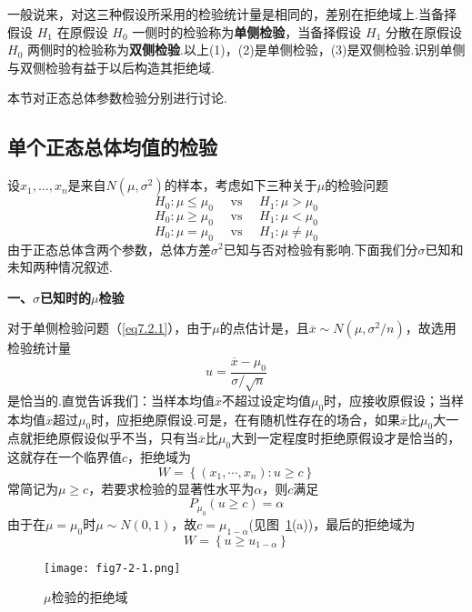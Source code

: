 一般说来，对这三种假设所采用的检验统计量是相同的，差别在拒绝域上.当备择假设 $H_{1}$ 在原假设 $H_{0}$ 一侧时的检验称为\textbf{单侧检验}，当备择假设 $H_{1}$ 分散在原假设 $H_{0}$ 两侧时的检验称为\textbf{双侧检验}.以上(1)，(2)是单侧检验，(3)是双侧检验.识别单侧与双侧检验有益于以后构造其拒绝域.

本节对正态总体参数检验分别进行讨论.
\subsection{单个正态总体均值的检验\label{7.2.1}}
设$x _ { 1 } , \dotsc , x _ { n }$是来自$N(\mu ,\sigma^{2})$的样本，考虑如下三种关于$\mu $的检验问题
\begin{equation}\label{eq7.2.1}
H _ { 0 } : \mu \leq \mu _ { 0 } \quad \text { vs } \quad H _ { 1 } : \mu > \mu _ { 0 }
\end{equation}
\begin{equation}\label{eq7.2.2}
H _ { 0 } : \mu \geq \mu _ { 0 } \quad \text { vs } \quad H _ { 1 } : \mu < \mu _ { 0 }
\end{equation}
\begin{equation}\label{eq7.2.3}
H _ { 0 } : \mu = \mu _ { 0 } \quad \text { vs } \quad H _ { 1 } : \mu \neq \mu _ { 0 }
\end{equation}
由于正态总体含两个参数，总体方差$\sigma^{2}$已知与否对检验有影响.下面我们分$\sigma$已知和未知两种情况叙述.

\textbf{一、$\sigma$已知时的$\mu$检验}

对于单侧检验问题（\ref{eq7.2.1}），由于$\mu $的点估计是，且$\overline { x } \sim N \left( \mu , \sigma ^ { 2 } / n \right)$，故选用检验统计量
\begin{equation}\label{eq7.2.4}
u = \frac { \overline { x } - \mu _ { 0 } } { \sigma / \sqrt { n } }
\end{equation}
是恰当的.直觉告诉我们：当样本均值$\overline{x}$不超过设定均值$\mu_{ 0 }$时，应接收原假设；当样本均值$\overline{x}$超过$\mu_{ 0 }$时，应拒绝原假设.可是，在有随机性存在的场合，如果$\overline{x}$比$\mu_{ 0 }$大一点就拒绝原假设似乎不当，只有当$\overline{x}$比$\mu_{ 0 }$大到一定程度时拒绝原假设才是恰当的，这就存在一个临界值$c$，拒绝域为
\begin{equation}\label{eq7.2.5}
W = \left\{ \left( x _ { 1 } , \cdots , x _ { n } \right) : u \geq c \right\}
\end{equation}
常简记为${\mu \geq c}$，若要求检验的显著性水平为$\alpha$，则$c$满足
\[P _ { \mu _ { 0 } } ( u \geq c ) = \alpha\]
由于在$\mu =\mu_{0}$时$\mu \sim N(0,1)$，故$c=\mu _{1-\alpha}$(见图~\ref{fig7.2.1}(a))，最后的拒绝域为
\begin{equation}\label{eq7.2.6}
W = \left\lbrace  u \geq u _ { 1 - \alpha }\right\rbrace 
\end{equation}
\begin{figure}[htbp]
	\centering
	\texttt{[image: fig7-2-1.png]}
	\caption{$\mu $检验的拒绝域}\label{fig7.2.1}
\end{figure}

